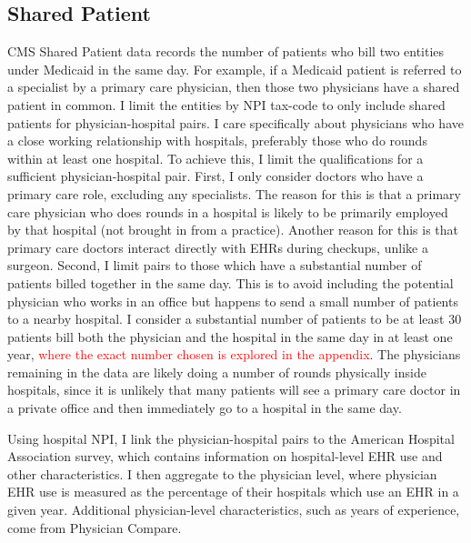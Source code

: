 \documentclass[11pt]{article}
\begin{document}
\subsection{Shared Patient}

CMS Shared Patient data records the number of patients who bill two entities under Medicaid in the same day. For example, if a Medicaid patient is referred to a specialist by a primary care physician, then those two physicians have a shared patient in common. I limit the entities by NPI tax-code to only include shared patients for physician-hospital pairs. I care specifically about physicians who have a close working relationship with hospitals, preferably those who do rounds within at least one hospital. To achieve this, I limit the qualifications for a sufficient physician-hospital pair. First, I only consider doctors who have a primary care role, excluding any specialists. The reason for this is that a primary care physician who does rounds in a hospital is likely to be primarily employed by that hospital (not brought in from a practice). Another reason for this is that primary care doctors interact directly with EHRs during checkups, unlike a surgeon. Second, I limit pairs to those which have a substantial number of patients billed together in the same day. This is to avoid including the potential physician who works in an office but happens to send a small number of patients to a nearby hospital. I consider a substantial number of patients to be at least 30 patients bill both the physician and the hospital in the same day in at least one year, \textcolor{red}{where the exact number chosen is explored in the appendix}. The physicians remaining in the data are likely doing a number of rounds physically inside hospitals, since it is unlikely that many patients will see a primary care doctor in a private office and then immediately go to a hospital in the same day. 

Using hospital NPI, I link the physician-hospital pairs to the American Hospital Association survey, which contains information on hospital-level EHR use and other characteristics. I then aggregate to the physician level, where physician EHR use is measured as the percentage of their hospitals which use an EHR in a given year. Additional physician-level characteristics, such as years of experience, come from Physician Compare. 
\end{document}
